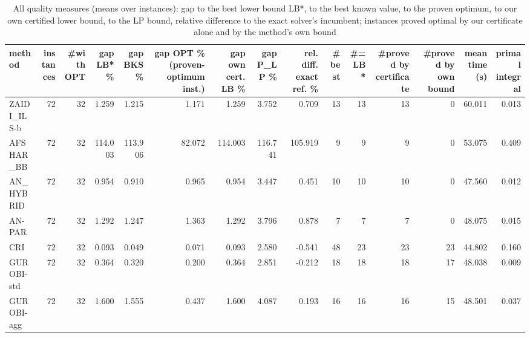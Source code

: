 \begin{table}[htbp]
\centering
\small
\caption{All quality measures (means over instances): gap to the best lower bound LB*, to the best known value, to the proven optimum, to our own certified lower bound, to the LP bound, relative difference to the exact solver's incumbent; instances proved optimal by our certificate alone and by the method's own bound}
\label{tab:E10b_state_of_the_art_60s_b60_all_metrics}
\begin{tabular}{lrrrrrrrrrrrrrr}
\toprule
method & instances & \#with OPT & gap LB* \% & gap BKS \% & gap OPT \% (proven-optimum inst.) & gap own cert. LB \% & gap P\_LP \% & rel. diff. exact ref. \% & \#best & \#= LB* & \#proved by certificate & \#proved by own bound & mean time (s) & primal integral \\
\midrule
ZAIDI\_ILS-b & 72 & 32 & 1.259 & 1.215 & 1.171 & 1.259 & 3.752 & 0.709 & 13 & 13 & 13 & 0 & 60.011 & 0.013 \\
AFSHAR\_BB & 72 & 32 & 114.003 & 113.906 & 82.072 & 114.003 & 116.741 & 105.919 & 9 & 9 & 9 & 0 & 53.075 & 0.409 \\
AN\_HYBRID & 72 & 32 & 0.954 & 0.910 & 0.965 & 0.954 & 3.447 & 0.451 & 10 & 10 & 10 & 0 & 47.560 & 0.012 \\
AN-PAR & 72 & 32 & 1.292 & 1.247 & 1.363 & 1.292 & 3.796 & 0.878 & 7 & 7 & 7 & 0 & 48.075 & 0.015 \\
CRI & 72 & 32 & 0.093 & 0.049 & 0.071 & 0.093 & 2.580 & -0.541 & 48 & 23 & 23 & 23 & 44.802 & 0.160 \\
GUROBI-std & 72 & 32 & 0.364 & 0.320 & 0.200 & 0.364 & 2.851 & -0.212 & 18 & 18 & 18 & 17 & 48.038 & 0.009 \\
GUROBI-agg & 72 & 32 & 1.600 & 1.555 & 0.437 & 1.600 & 4.087 & 0.193 & 16 & 16 & 16 & 15 & 48.501 & 0.037 \\
\bottomrule
\end{tabular}
\end{table}
